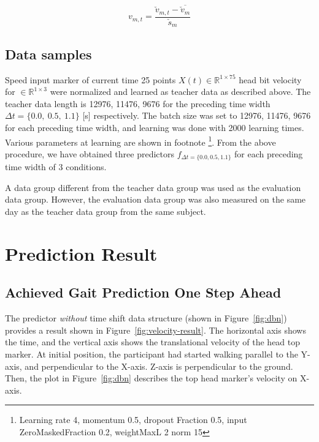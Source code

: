 \documentclass{sigchi}
\begin{document}
\begin{equation}
  v_{m,t} = \frac{\check{v}_{m,t} - \overline{\check{v}_{m}}}{\check{s}_m} 
  \label{eq:regularization}
\end{equation}


\subsection{Data samples}
Speed input marker of current time 25 points $ X (t) \in \mathbb {R} ^ {1 \times 75} $ head bit velocity for $ \in \mathbb {R}^{ 1 \times 3} $ were normalized and learned as teacher data as described above. The teacher data length is 12976, 11476, 9676 for the preceding time width $ \Delta t = \{0.0, \ 0.5, \ 1.1 \} $ [s] respectively. The batch size was set to 12976, 11476, 9676 for each preceding time width, and learning was done with 2000 learning times. Various parameters at learning are shown in footnote \footnote{Learning rate 4, momentum 0.5, dropout Fraction 0.5, input ZeroMaskedFraction 0.2, weightMaxL 2 norm 15}. From the above procedure, we have obtained three predictors $ f_{\Delta t = \{0.0, 0.5, 1.1 \}} $ for each preceding time width of 3 conditions.

A data group different from the teacher data group was used as the evaluation data group. However, the evaluation data group was also measured on the same day as the teacher data group from the same subject.



\section{Prediction Result}%

\subsection {Achieved Gait Prediction One Step Ahead}

The predictor \textit{without} time shift data structure (shown in Figure~\ref{fig:dbn}) provides a result shown in Figure~\ref{fig:velocity-result}. The horizontal axis shows the time, and the vertical axis shows the translational velocity of the head top marker. At initial position, the participant had started walking parallel to the Y-axis, and perpendicular to the X-axis. Z-axis is perpendicular to the ground. Then, the plot in Figure~\ref{fig:dbn} describes the top head marker's velocity on X-axis. 
\end{document}
